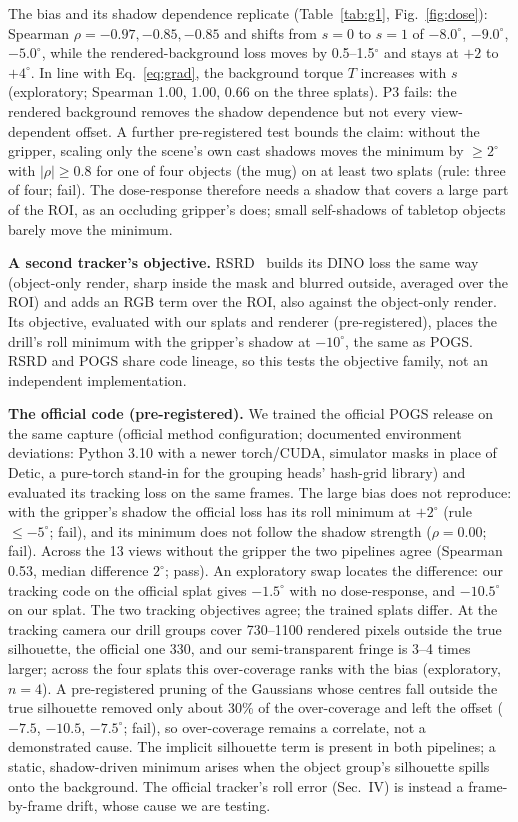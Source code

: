 \documentclass[conference]{IEEEtran}
\begin{document}
The bias and its shadow dependence replicate (Table~\ref{tab:g1}, Fig.~\ref{fig:dose}): Spearman $\rho=-0.97,-0.85,
-0.85$ and shifts from $s=0$ to $s=1$ of $-8.0^\circ$, $-9.0^\circ$, $-5.0^\circ$, while the rendered-background loss
moves by 0.5--1.5$^\circ$ and stays at $+2$ to $+4^\circ$. In line with Eq.~\eqref{eq:grad}, the background torque $T$
increases with $s$ (exploratory; Spearman 1.00, 1.00, 0.66 on the three splats). P3 fails: the rendered background removes the shadow dependence but
not every view-dependent offset. A further pre-registered test bounds the claim: without the gripper, scaling only
the scene's own cast shadows moves the minimum by $\ge2^\circ$ with $|\rho|\ge0.8$ for one of four objects (the mug) on at
least two splats (rule: three of four; fail). The dose-response therefore needs a shadow that covers a large part of
the ROI, as an occluding gripper's does; small self-shadows of tabletop objects barely move the minimum.

\textbf{A second tracker's objective.} RSRD~\cite{kerr2024rsrd} builds its DINO loss the same way (object-only render,
sharp inside the mask and blurred outside, averaged over the ROI) and adds an RGB term over the ROI, also against
the object-only render. Its objective, evaluated with our splats and renderer (pre-registered), places the drill's
roll minimum with the gripper's shadow at $-10^\circ$, the same as POGS. RSRD and POGS share code lineage, so this
tests the objective family, not an independent implementation.

\textbf{The official code (pre-registered).} We trained the official POGS release on the same capture (official
method configuration; documented environment deviations: Python 3.10 with a newer torch/CUDA, simulator masks in
place of Detic, a pure-torch stand-in for the grouping heads' hash-grid library) and evaluated its tracking loss on
the same frames. The large bias does not reproduce: with the gripper's shadow the official loss has its roll minimum
at $+2^\circ$ (rule $\le-5^\circ$; fail), and its minimum does not follow the shadow strength ($\rho=0.00$; fail).
Across the 13 views without the gripper the two pipelines agree (Spearman 0.53, median difference $2^\circ$; pass).
An exploratory swap locates the difference: our tracking code on the official splat gives $-1.5^\circ$ with no
dose-response, and $-10.5^\circ$ on our splat. The two tracking objectives agree; the trained splats differ. At the
tracking camera our drill groups cover 730--1100 rendered pixels outside the true silhouette, the official one 330,
and our semi-transparent fringe is 3--4 times larger; across the four splats this over-coverage ranks with the bias
(exploratory, $n=4$). A pre-registered pruning of the Gaussians whose centres fall outside the true silhouette
removed only about 30\% of the over-coverage and left the offset ($-7.5$, $-10.5$, $-7.5^\circ$; fail), so
over-coverage remains a correlate, not a demonstrated cause. The implicit silhouette term is present in both pipelines; a static, shadow-driven minimum
arises when the object group's silhouette spills onto the background. The official tracker's roll error (Sec.~IV) is
instead a frame-by-frame drift, whose cause we are testing.
\end{document}
